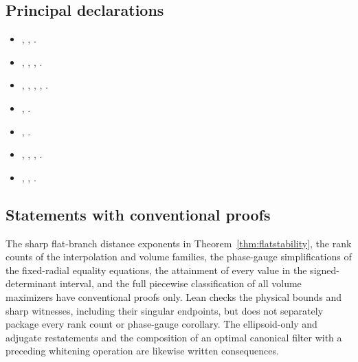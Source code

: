 \documentclass[11pt,a4paper]{article}
\theoremstyle{remark}\newtheorem{remark}[theorem]{Remark}
\begin{document}
\subsection{Principal declarations}
\begin{itemize}
\small\setlength{\itemsep}{1pt}\setlength{\parsep}{0pt}
\item {},
,
.
\item {},
,
,
.
\item {},
,
,
,
.
\item {},
.
\item {},
.
\item {},
,
,
.
\item {},
,
.
\end{itemize}

\subsection{Statements with conventional proofs}
The sharp flat-branch distance exponents in
Theorem~\ref{thm:flatstability}, the rank counts of the interpolation and
volume families, the phase-gauge simplifications of the fixed-radial
equality equations, the attainment of every value in the signed-determinant
interval, and the full piecewise classification of all volume maximizers
have conventional proofs only. Lean checks the physical bounds and sharp
witnesses, including their singular endpoints, but does not separately
package every rank count or phase-gauge corollary. The ellipsoid-only and
adjugate restatements and the composition of an optimal canonical filter
with a preceding whitening operation are likewise written consequences.
\end{document}

